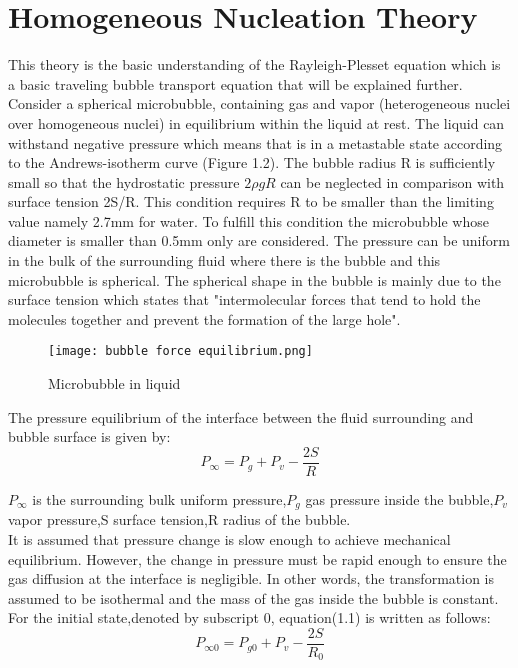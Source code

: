 \section{Homogeneous Nucleation Theory}
This theory is the basic understanding
of the Rayleigh-Plesset equation which is a basic traveling bubble
transport equation that will be explained further.\\ Consider a
spherical microbubble, containing gas and vapor (heterogeneous nuclei
over homogeneous nuclei) in equilibrium within the liquid at
rest. The liquid can withstand negative pressure which means that
is in a metastable state according to the Andrews-isotherm curve (Figure
1.2). The bubble radius R is sufficiently small so that the
hydrostatic pressure $2\rho gR$ can be neglected in comparison with
surface tension 2S/R. This condition requires R to be smaller than
the limiting value namely 2.7mm for water. To 
fulfill this condition the microbubble whose diameter is
smaller than 0.5mm only are considered. The pressure can be uniform
in the bulk of the surrounding fluid where there is the bubble and
this microbubble is spherical. The spherical shape in the bubble is
mainly due to the surface tension which states that "intermolecular
forces that tend to hold the molecules together and prevent the
formation of the large hole".\\

\begin{figure}[H]
    \centering
    \texttt{[image: bubble force equilibrium.png]}
    \caption{Microbubble in liquid \cite{FundamentalsofCavitation.2004}}
    \label{fig:fig3}
\end{figure}

The pressure equilibrium of the interface between the fluid
surrounding and bubble surface is given by:\\
\begin{equation}
P_{\infty} =P_g + P_v -\frac{2S}{R}
\end{equation}

${P_\infty}$ is the surrounding bulk uniform pressure,$P_g$ gas
pressure inside the bubble,$P_v$vapor pressure,S surface tension,R
radius of the bubble.\\ It is assumed that pressure change is slow
enough to achieve mechanical equilibrium. However, the change in
pressure must be rapid enough to ensure the gas diffusion at the
interface is negligible.  In other words, the transformation is
assumed to be isothermal and the mass of the gas inside the bubble is
constant.\\ For the initial state,denoted by subscript 0,
equation(1.1) is written as follows:
\begin{equation}
P_{{\infty}{0}} =P_{g0}+P_v-\frac{2S}{R_0}
\end{equation}

